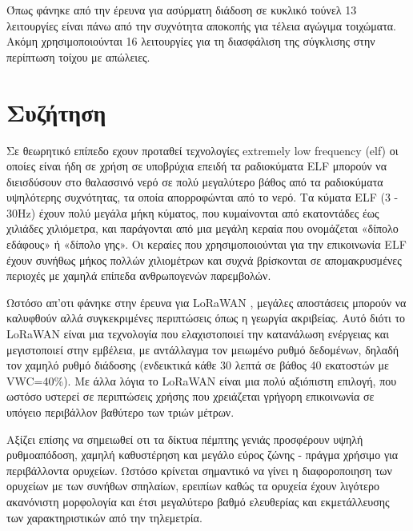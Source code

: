 \documentclass[12pt]{article}
\begin{document}
\begin{multicols*}{2}
        Όπως φάνηκε από την έρευνα για ασύρματη διάδοση σε κυκλικό τούνελ \cite*{dudley_wireless_2005}
        13 λειτουργίες είναι πάνω από την συχνότητα αποκοπής για τέλεια αγώγιμα τοιχώματα. Ακόμη
        χρησιμοποιούνται 16 λειτουργίες για τη διασφάλιση της σύγκλισης στην περίπτωση τοίχου 
        με απώλειες.



    \section{\normalsize  \textsf{Συζήτηση}}
        Σε θεωρητικό επίπεδο εχουν προταθεί τεχνολογίες extremely low frequency
        (elf) οι οποίες είναι ήδη σε χρήση σε υποβρύχια επειδή τα ραδιοκύματα ELF μπορούν να
        διεισδύσουν στο θαλασσινό νερό σε πολύ μεγαλύτερο βάθος από τα ραδιοκύματα υψηλότερης
        συχνότητας, τα οποία απορροφώνται από το νερό. Τα κύματα ELF (3 - 30Hz) έχουν πολύ
        μεγάλα μήκη κύματος, που κυμαίνονται από εκατοντάδες έως χιλιάδες χιλιόμετρα, και
        παράγονται από μια μεγάλη κεραία που ονομάζεται «δίπολο εδάφους» ή «δίπολο γης». Οι
        κεραίες που χρησιμοποιούνται για την επικοινωνία ELF έχουν συνήθως μήκος πολλών
        χιλιομέτρων και συχνά βρίσκονται σε απομακρυσμένες περιοχές με χαμηλά επίπεδα
        ανθρωπογενών παρεμβολών.

        Ωστόσο απ'οτι φάνηκε στην έρευνα για LoRaWAN \cite*{zhao_feasibility_2023}, μεγάλες 
        αποστάσεις μπορούν να καλυφθούν αλλά συγκεκριμένες περιπτώσεις όπως η γεωργία ακριβείας.
        Αυτό διότι το LoRaWAN είναι μια τεχνολογία που ελαχιστοποιεί την κατανάλωση ενέργειας και
        μεγιστοποιεί στην εμβέλεια, με αντάλλαγμα τον μειωμένο ρυθμό δεδομένων, δηλαδή τον χαμηλό
        ρυθμό διάδοσης (ενδεικτικά κάθε 30 λεπτά σε βάθος 40 εκατοστών με VWC=40\%). Με άλλα
        λόγια το LoRaWAN είναι μια πολύ αξιόπιστη επιλογή, που ωστόσο υστερεί σε περιπτώσεις 
        χρήσης που χρειάζεται γρήγορη επικοινωνία σε υπόγειο περιβάλλον βαθύτερο των τριών μέτρων.

        Αξίζει επίσης να σημειωθεί οτι τα δίκτυα πέμπτης γενιάς προσφέρουν υψηλή ρυθμοαπόδοση,
        χαμηλή καθυστέρηση και μεγάλο εύρος ζώνης - πράγμα χρήσιμο για περιβάλλοντα ορυχείων.
        Ωστόσο κρίνεται σημαντικό να γίνει η διαφοροποιηση των ορυχείων με των συνήθων σπηλαίων,
        ερειπίων καθώς τα ορυχεία έχουν λιγότερο ακανόνιστη μορφολογία και έτσι μεγαλύτερο βαθμό
        ελευθερίας και εκμετάλλευσης των χαρακτηριστικών από την τηλεμετρία.


\end{multicols*}
\end{document}
